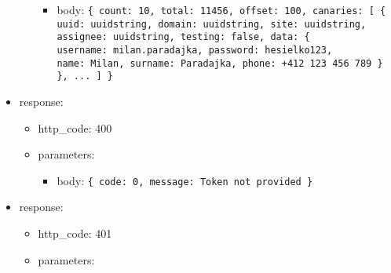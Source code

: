 \documentclass[
]{article}
\begin{document}
\begin{itemize}
\begin{itemize}
    \begin{itemize}
    \item
      body: \texttt{\{
      \textquotesingle{}count\textquotesingle{}:\ 10,
      \textquotesingle{}total\textquotesingle{}:\ 11456,
      \textquotesingle{}offset\textquotesingle{}:\ 100,
      \textquotesingle{}canaries\textquotesingle{}:\ {[}
      	\{
      		\textquotesingle{}uuid\textquotesingle{}:\ \textquotesingle{}uuidstring\textquotesingle{},
      		\textquotesingle{}domain\textquotesingle{}:\ \textquotesingle{}uuidstring\textquotesingle{},
      		\textquotesingle{}site\textquotesingle{}:\ \textquotesingle{}uuidstring\textquotesingle{},
      		\textquotesingle{}assignee\textquotesingle{}:\ \textquotesingle{}uuidstring\textquotesingle{},
      		\textquotesingle{}testing\textquotesingle{}:\ false,
      		\textquotesingle{}data\textquotesingle{}:\ \{
      			\textquotesingle{}username\textquotesingle{}:\ \textquotesingle{}milan.paradajka\textquotesingle{},
      			\textquotesingle{}password\textquotesingle{}:\ \textquotesingle{}hesielko123\textquotesingle{},
      			\textquotesingle{}name\textquotesingle{}:\ \textquotesingle{}Milan\textquotesingle{},
      			\textquotesingle{}surname\textquotesingle{}:\ \textquotesingle{}Paradajka\textquotesingle{},
      			\textquotesingle{}phone\textquotesingle{}:\ \textquotesingle{}+412\ 123\ 456\ 789\textquotesingle{}
      		\}
      	\},
      	...
      {]}
      \}}
    \end{itemize}
  \end{itemize}
\item
  response:

  \begin{itemize}
  \item
    http\_code: 400
  \item
    parameters:

    \begin{itemize}
    \item
      body: \texttt{\{
      \textquotesingle{}code\textquotesingle{}:\ 0,\ 
      \textquotesingle{}message\textquotesingle{}:\ \textquotesingle{}Token\ not\ provided\textquotesingle{}
      \}}
    \end{itemize}
  \end{itemize}
\item
  response:

  \begin{itemize}
  \item
    http\_code: 401
  \item
    parameters:


\end{itemize}
\end{itemize}
\end{document}
